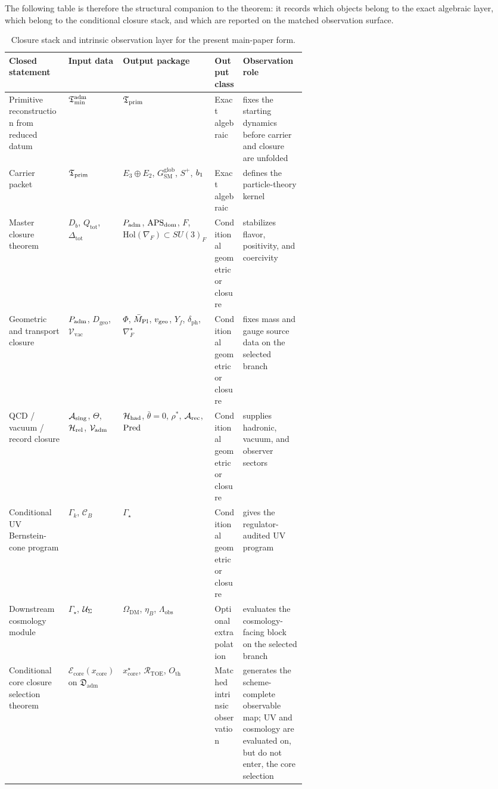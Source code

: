 The following table is therefore the structural companion to the theorem: it records which
objects belong to the exact algebraic layer, which belong to the conditional closure stack, and
which are reported on the matched observation surface.

\begin{table}[t]
\centering
\small
\begin{tabularx}{\linewidth}{@{}>{\raggedright\arraybackslash}p{0.20\linewidth}>{\raggedright\arraybackslash}p{0.18\linewidth}>{\raggedright\arraybackslash}p{0.20\linewidth}YY@{}}
\toprule
Closed statement & Input data & Output package & Output class & Observation role \\
\midrule
Primitive reconstruction from reduced datum & $\mathfrak T_{\mathrm{min}}^{\mathrm{adm}}$ & $\mathfrak T_{\mathrm{prim}}$ & Exact algebraic & fixes the starting dynamics before carrier and closure are unfolded \\
Carrier packet & $\mathfrak T_{\mathrm{prim}}$ & $E_3\oplus E_2$, $G_{\mathrm{SM}}^{\mathrm{glob}}$, $S^+$, $b_1$ & Exact algebraic & defines the particle-theory kernel \\
Master closure theorem & $D_b$, $Q_{\mathrm{tot}}$, $\Delta_{\mathrm{tot}}$ & $P_{\mathrm{adm}}$, $\mathrm{APS}_{\mathrm{dom}}$, $F$, $\mathrm{Hol}(\nabla_F)\subset SU(3)_F$ & Conditional geometric or closure & stabilizes flavor, positivity, and coercivity \\
Geometric and transport closure & $P_{\mathrm{adm}}$, $D_{\mathrm{geo}}$, $\mathcal V_{\mathrm{vac}}$ & $\Phi$, $\bar M_{\mathrm{Pl}}$, $v_{\mathrm{geo}}$, $Y_f$, $\delta_{\mathrm{ph}}$, $\nabla_F^\star$ & Conditional geometric or closure & fixes mass and gauge source data on the selected branch \\
QCD / vacuum / record closure & $\mathcal A_{\mathrm{sing}}$, $\Theta$, $\mathcal H_{\mathrm{rel}}$, $\mathcal V_{\mathrm{adm}}$ & $\mathcal H_{\mathrm{had}}$, $\bar\theta=0$, $\rho^\ast$, $\mathcal A_{\mathrm{rec}}$, $\operatorname{Pred}$ & Conditional geometric or closure & supplies hadronic, vacuum, and observer sectors \\
Conditional UV Bernstein-cone program & $\Gamma_k$, $\mathcal C_B$ & $\Gamma_\star$ & Conditional geometric or closure & gives the regulator-audited UV program \\
Downstream cosmology module & $\Gamma_\star$, $\mathcal U_\Sigma$ & $\Omega_{\mathrm{DM}}$, $\eta_B$, $\Lambda_{\mathrm{obs}}$ & Optional extrapolation & evaluates the cosmology-facing block on the selected branch \\
Conditional core closure selection theorem & $\mathcal E_{\mathrm{core}}(x_{\mathrm{core}})$ on $\mathfrak D_{\mathrm{adm}}$ & $x_{\mathrm{core}}^\star$, $\mathcal R_{\mathrm{TOE}}$, $O_{\mathrm{th}}$ & Matched intrinsic observation & generates the scheme-complete observable map; UV and cosmology are evaluated on, but do not enter, the core selection \\
\bottomrule
\end{tabularx}
\caption{Closure stack and intrinsic observation layer for the present main-paper form.}
\label{tab:proof-obligations}
\end{table}

